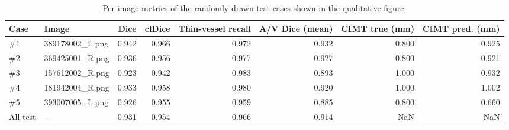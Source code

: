 \begin{table}
\caption{Per-image metrics of the randomly drawn test cases shown in the qualitative figure.}
\label{tab:qualitative_random_metrics}
\begin{tabular}{llrrrrrr}
\toprule
Case & Image & Dice & clDice & Thin-vessel recall & A/V Dice (mean) & CIMT true (mm) & CIMT pred. (mm) \\
\midrule
\#1 & 389178002\_L.png & 0.942 & 0.966 & 0.972 & 0.932 & 0.800 & 0.925 \\
\#2 & 369425001\_R.png & 0.936 & 0.956 & 0.977 & 0.927 & 0.800 & 0.921 \\
\#3 & 157612002\_R.png & 0.923 & 0.942 & 0.983 & 0.893 & 1.000 & 0.932 \\
\#4 & 181942004\_R.png & 0.933 & 0.958 & 0.980 & 0.920 & 1.000 & 1.002 \\
\#5 & 393007005\_L.png & 0.926 & 0.955 & 0.959 & 0.885 & 0.800 & 0.660 \\
All test & – & 0.931 & 0.954 & 0.966 & 0.914 & NaN & NaN \\
\bottomrule
\end{tabular}
\end{table}
